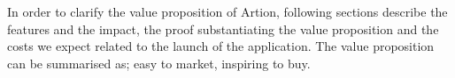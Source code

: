 In order to clarify the value proposition of Artion, following sections describe the features and the impact, the proof substantiating the value proposition and the costs we expect related to the launch of the application. The value proposition can be summarised as; easy to market, inspiring to buy. 